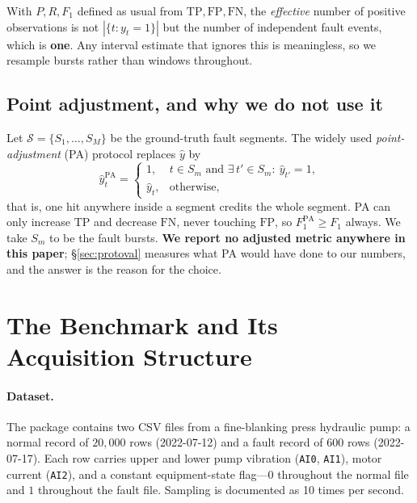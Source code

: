 \documentclass{article}
\begin{document}
With $P,R,F_1$ defined as usual from $\mathrm{TP},\mathrm{FP},\mathrm{FN}$, the
\emph{effective} number of positive observations is not $|\{t:y_t=1\}|$ but the
number of independent fault events, which is \textbf{one}. Any interval
estimate that ignores this is meaningless, so we resample bursts rather than
windows throughout.

\subsection{Point adjustment, and why we do not use it}
\label{sub:pa}

Let $\mathcal{S}=\{S_1,\dots,S_M\}$ be the ground-truth fault segments. The
widely used \emph{point-adjustment} (PA) protocol \citep{kim2022towards}
replaces $\hat y$ by
\begin{equation}
\hat y^{\mathrm{PA}}_t=
\begin{cases}
1, & t\in S_m \text{ and } \exists\, t'\!\in S_m:\ \hat y_{t'}=1,\\
\hat y_t, & \text{otherwise,}
\end{cases}
\label{eq:pa}
\end{equation}
that is, one hit anywhere inside a segment credits the whole segment. PA can
only increase $\mathrm{TP}$ and decrease $\mathrm{FN}$, never touching
$\mathrm{FP}$, so $F_1^{\mathrm{PA}}\ge F_1$ always. We take $S_m$ to be the
fault bursts. \textbf{We report no adjusted metric anywhere in this paper};
\S\ref{sec:protoval} measures what PA would have done to our numbers, and the
answer is the reason for the choice.

\section{The Benchmark and Its Acquisition Structure}
\label{sec:data}

\paragraph{Dataset.} The package \citep{kamp2022press} contains two CSV files
from a fine-blanking press hydraulic pump: a normal record of $20{,}000$ rows
(2022-07-12) and a fault record of $600$ rows (2022-07-17). Each row carries
upper and lower pump vibration (\texttt{AI0}, \texttt{AI1}), motor current
(\texttt{AI2}), and a constant equipment-state flag---$0$ throughout the
normal file and $1$ throughout the fault file. Sampling is documented as
10 times per second.
\end{document}
